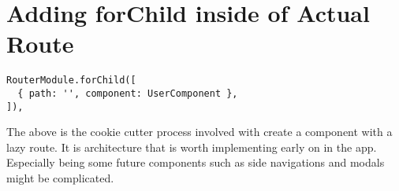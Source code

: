 \section{Adding forChild inside of Actual Route}
\begin{lstlisting}
RouterModule.forChild([
  { path: '', component: UserComponent },
]),
\end{lstlisting}

The above is the cookie cutter process involved with create a component with a
lazy route. It is architecture that is worth implementing early on in the app.
Especially being some future components such as side navigations and modals
might be complicated.
